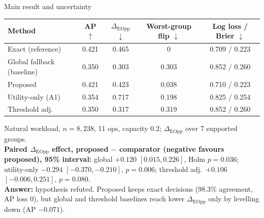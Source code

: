 \documentclass[aspectratio=169,11pt]{beamer}
\begin{document}
\begin{frame}{Main result and uncertainty}
\begin{center}\small\begin{tabularx}{0.95\linewidth}{Xcccc}\toprule
Method & AP $\uparrow$ & $\Delta_{\mathrm{EOpp}}$ $\downarrow$ & Worst-group flip $\downarrow$ & Log loss / Brier $\downarrow$\\\midrule
Exact (reference) & 0.421 & 0.465 & 0 & 0.709 / 0.223\\
Global fallback (baseline) & 0.350 & 0.303 & 0.303 & 0.852 / 0.260\\
Proposed & 0.421 & 0.423 & 0.038 & 0.710 / 0.223\\
Utility-only (A1) & 0.354 & 0.717 & 0.198 & 0.825 / 0.254\\
Threshold adj. & 0.350 & 0.317 & 0.319 & 0.852 / 0.260\\\bottomrule
\end{tabularx}\end{center}
\footnotesize Natural workload, $n=8{,}238$, 11 ops, capacity 0.2; $\Delta_{\mathrm{EOpp}}$ over 7 supported groups.\\[2pt]
\textbf{Paired $\Delta_{\mathrm{EOpp}}$ effect, proposed $-$ comparator (negative favours proposed), 95\% interval:} global $+0.120$ $[0.015,0.226]$, Holm $p=0.036$; utility-only $-0.294$ $[-0.370,-0.210]$, $p=0.006$; threshold adj.\ $+0.106$ $[-0.006,0.251]$, $p=0.080$.\\[2pt]
\textbf{Answer:} hypothesis refuted. Proposed keeps exact decisions (98.3\% agreement, AP loss 0), but global and threshold baselines reach lower $\Delta_{\mathrm{EOpp}}$ only by levelling down (AP $-0.071$).
\end{frame}
\end{document}
